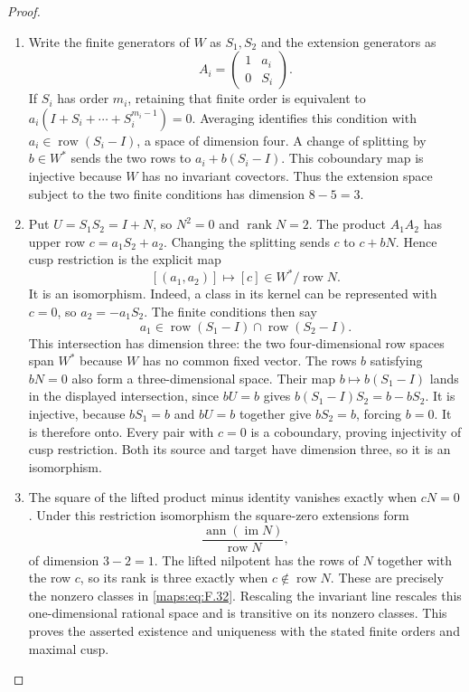 \documentclass[11pt,a4paper]{article}
\theoremstyle{definition}
\begin{document}
\begin{proof}
\begin{enumerate}[label=\arabic*.]
\item Write the finite generators of $W$ as $S_1,S_2$ and the
extension generators as
\[
 A_i=\begin{pmatrix}1&a_i\\0&S_i\end{pmatrix}.
\]
If $S_i$ has order $m_i$, retaining that finite order is equivalent
to $a_i(I+S_i+\cdots+S_i^{m_i-1})=0$.  Averaging identifies this
condition with $a_i\in\operatorname{row}(S_i-I)$, a space of
dimension four.  A change of splitting by $b\in W^*$ sends the
two rows to $a_i+b(S_i-I)$.  This coboundary map is injective
because $W$ has no invariant covectors.  Thus the extension
space subject to the two finite conditions has dimension $8-5=3$.

\item Put $U=S_1S_2=I+N$, so $N^2=0$ and $\operatorname{rank}N=2$.
The product $A_1A_2$ has upper row $c=a_1S_2+a_2$.
Changing the splitting sends $c$ to $c+bN$.  Hence cusp restriction
is the explicit map
\[
 [(a_1,a_2)]\longmapsto[c]\in W^*/\operatorname{row}N.
\]
It is an isomorphism.  Indeed, a class in its kernel can be
represented with $c=0$, so $a_2=-a_1S_2$.  The finite conditions
then say
\[
 a_1\in\operatorname{row}(S_1-I)
              \cap\operatorname{row}(S_2-I).
\]
This intersection has dimension three: the two four-dimensional
row spaces span $W^*$ because $W$ has no common fixed vector.
The rows $b$ satisfying $bN=0$ also form a three-dimensional
space.  Their map $b\mapsto b(S_1-I)$ lands in the displayed
intersection, since $bU=b$ gives
$b(S_1-I)S_2=b-bS_2$.  It is injective, because
$bS_1=b$ and $bU=b$ together give $bS_2=b$, forcing $b=0$.
It is therefore onto.  Every pair with $c=0$ is a coboundary,
proving injectivity of cusp restriction.  Both its source and
target have dimension three, so it is an isomorphism.

\item The square of the lifted product minus identity vanishes
exactly when $cN=0$.  Under this restriction isomorphism the
square-zero extensions form
\[
 \frac{\operatorname{ann}(\operatorname{im}N)}
      {\operatorname{row}N},
 \tag{F.32}\label{maps:eq:F.32}
\]
of dimension $3-2=1$.  The lifted nilpotent has the rows of $N$
together with the row $c$, so its rank is three exactly when
$c\notin\operatorname{row}N$.  These are precisely the nonzero
classes in \eqref{maps:eq:F.32}.  Rescaling the invariant line
rescales this one-dimensional rational space and is transitive
on its nonzero classes.  This proves the asserted existence and
uniqueness with the stated finite orders and maximal cusp.
\end{enumerate}
\end{proof}
\end{document}
